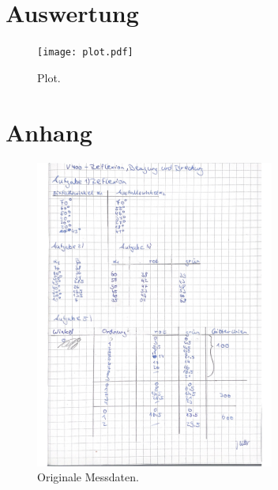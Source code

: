 \section{Auswertung}
\label{sec:Auswertung}

\begin{figure}
  \centering
  \texttt{[image: plot.pdf]}
  \caption{Plot.}
  \label{fig:plot}
\end{figure}

\printbibliography{}

\section*{Anhang}
\label{sec:anhang}

\begin{figure}
  \centering
  \includegraphics[width=0.7\textwidth]{data/origDaten.jpg}
  \caption{Originale Messdaten.}
  \label{fig:origDaten1}
\end{figure}